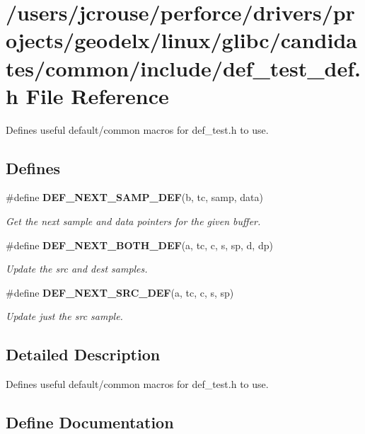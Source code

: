 \section{/users/jcrouse/perforce/drivers/projects/geodelx/linux/glibc/candidates/common/include/def\_\-test\_\-def.h File Reference}
\label{def__test__def_8h}
Defines useful default/common macros for def\_\-test.h to use. 


\subsection*{Defines}
\begin{CompactItemize}
\item 
\#define {\bf DEF\_\-NEXT\_\-SAMP\_\-DEF}(b, tc, samp, data)
\begin{CompactList}\small\item\em Get the next sample and data pointers for the given buffer.\item\end{CompactList}\item 
\#define {\bf DEF\_\-NEXT\_\-BOTH\_\-DEF}(a, tc, c, s, sp, d, dp)
\begin{CompactList}\small\item\em Update the src and dest samples.\item\end{CompactList}\item 
\#define {\bf DEF\_\-NEXT\_\-SRC\_\-DEF}(a, tc, c, s, sp)
\begin{CompactList}\small\item\em Update just the src sample.\item\end{CompactList}\end{CompactItemize}


\subsection{Detailed Description}
Defines useful default/common macros for def\_\-test.h to use.





\subsection{Define Documentation}
